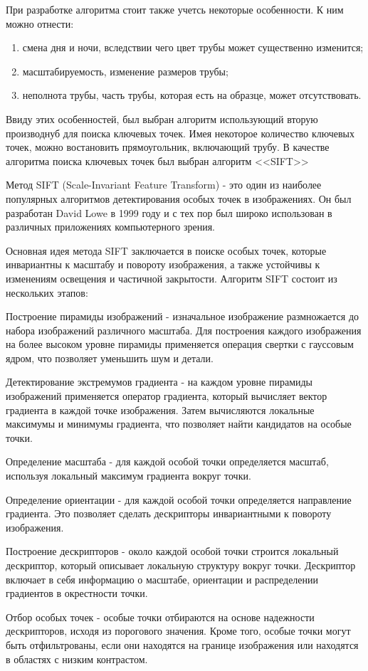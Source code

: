 \documentclass[14pt, a4paper]{extreport}
\begin{document}
	При разработке алгоритма стоит также учетсь некоторые особенности. К ним можно отнести:
	\begin{enumerate}[label={\arabic*)}]
		\item смена дня и ночи, вследствии чего цвет трубы может существенно изменится;
		\item масштабируемость, изменение размеров трубы;
		\item неполнота трубы, часть трубы, которая есть на образце, может отсутствовать.
	\end{enumerate}
	Ввиду этих особенностей, был выбран алгоритм использующий вторую производнуб для поиска ключевых точек. Имея некоторое количество ключевых точек, можно востановить прямоугольник, включающий трубу. В качестве алгоритма поиска ключевых точек был выбран алгоритм <<SIFT>>
	
	Метод SIFT (Scale-Invariant Feature Transform) - это один из наиболее популярных алгоритмов детектирования особых точек в изображениях. Он был разработан David Lowe в 1999 году и с тех пор был широко использован в различных приложениях компьютерного зрения.
	
	Основная идея метода SIFT заключается в поиске особых точек, которые инвариантны к масштабу и повороту изображения, а также устойчивы к изменениям освещения и частичной закрытости. Алгоритм SIFT состоит из нескольких этапов:
	
	Построение пирамиды изображений - изначальное изображение размножается до набора изображений различного масштаба. Для построения каждого изображения на более высоком уровне пирамиды применяется операция свертки с гауссовым ядром, что позволяет уменьшить шум и детали.
	
	Детектирование экстремумов градиента - на каждом уровне пирамиды изображений применяется оператор градиента, который вычисляет вектор градиента в каждой точке изображения. Затем вычисляются локальные максимумы и минимумы градиента, что позволяет найти кандидатов на особые точки.
	
	Определение масштаба - для каждой особой точки определяется масштаб, используя локальный максимум градиента вокруг точки.
	
	Определение ориентации - для каждой особой точки определяется направление градиента. Это позволяет сделать дескрипторы инвариантными к повороту изображения.
	
	Построение дескрипторов - около каждой особой точки строится локальный дескриптор, который описывает локальную структуру вокруг точки. Дескриптор включает в себя информацию о масштабе, ориентации и распределении градиентов в окрестности точки.
	
	Отбор особых точек - особые точки отбираются на основе надежности дескрипторов, исходя из порогового значения. Кроме того, особые точки могут быть отфильтрованы, если они находятся на границе изображения или находятся в областях с низким контрастом.
	
	
\end{document}
